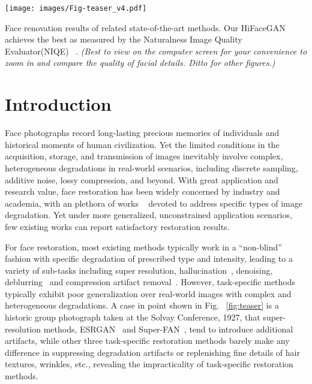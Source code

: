 \documentclass[sigconf]{acmart}
\begin{document}


\begin{teaserfigure}
\texttt{[image: images/Fig-teaser\_v4.pdf]}
  \caption{Face renovation results of related state-of-the-art methods. Our HiFaceGAN achieves the best as measured by the Naturalness Image Quality Evaluator(NIQE) ~\cite{niqe}. \emph{(Best to view on the computer screen for your convenience to zoom in and compare the quality of facial details. Ditto for other figures.)}
  }
  \label{fig:teaser}
\end{teaserfigure}

\maketitle

\section{Introduction}


Face photographs record long-lasting precious memories of individuals and historical moments of human civilization. Yet the limited conditions in the acquisition, storage, and transmission of images inevitably involve complex, heterogeneous degradations in real-world scenarios, including discrete sampling, additive noise, lossy compression, and beyond. With great application and research value, face restoration has been widely concerned by industry and academia, with an plethora of works ~\cite{ir_review}\cite{deblurring_survey}\cite{com_art_reduction_survey} devoted to address specific types of image degradation. Yet under more generalized, unconstrained application scenarios, few existing works can report satisfactory restoration results.

For face restoration, most existing methods typically work in a ``non-blind'' fashion with specific degradation of prescribed type and intensity, leading to a variety of sub-tasks including super resolution\cite{sr_review}\cite{srcnn}\cite{edsr}\cite{esrgan}, hallucination~\cite{fh_review}\cite{face_hallu_4}, denoising\cite{RIDNet}\cite{VDNet}, deblurring~\cite{deblurring_survey}\cite{DeblurGAN}\cite{DeblurGANv2} and compression artifact removal~\cite{com_art_reduction_survey}\cite{ARCNN}\cite{EPGAN}. However, task-specific methods typically exhibit poor generalization over real-world images with complex and heterogeneous degradations. A case in point shown in Fig. ~\ref{fig:teaser} is a historic group photograph taken at the Solvay Conference, 1927, that super-resolution methods, ESRGAN~\cite{esrgan} and Super-FAN~\cite{SuperFAN}, tend to introduce additional artifacts, while other three task-specific restoration methods barely make any difference in suppressing degradation artifacts or replenishing fine details of hair textures, wrinkles, etc., revealing the impracticality of task-specific restoration methods.
\end{document}
